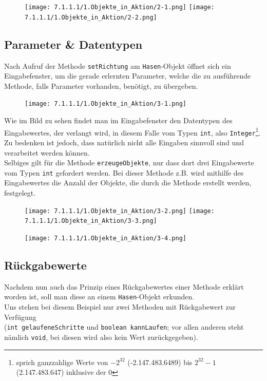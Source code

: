 \documentclass{scrartcl}   %
\begin{document}
\begin{figure}[ht]
	\centering
	\texttt{[image: 7.1.1.1/1.Objekte\_in\_Aktion/2-1.png]}
	\hspace{0.5cm}
	\texttt{[image: 7.1.1.1/1.Objekte\_in\_Aktion/2-2.png]}
\end{figure}

\subsection{Parameter \& Datentypen}
Nach Aufruf der Methode \texttt{setRichtung} am \texttt{Hasen}-Objekt öffnet sich ein Eingabefenster, um die gerade erlernten Parameter, welche die zu ausführende Methode, falls Parameter vorhanden, benötigt, zu übergeben.

\begin{figure}[ht]
	\centering
	\texttt{[image: 7.1.1.1/1.Objekte\_in\_Aktion/3-1.png]}
\end{figure}

Wie im Bild zu sehen findet man im Eingabefenster den Datentypen des Eingabewertes, der verlangt wird, in diesem Falle vom Typen \texttt{int}, also \texttt{Integer}\footnote{sprich ganzzahlige Werte von $-2^{32}$ (-2.147.483.6489) bis $2^{32} -1$ (2.147.483.647) inklusive der 0}. Zu bedenken ist jedoch, dass natürlich nicht alle Eingaben sinnvoll sind und verarbeitet werden können.\\
Selbiges gilt für die Methode \texttt{erzeugeObjekte}, nur dass dort drei Eingabewerte vom Typen \texttt{int} gefordert werden. Bei dieser Methode z.B. wird mithilfe des Eingabewertes die Anzahl der Objekte, die durch die Methode erstellt werden, festgelegt.

\begin{figure}[ht]
	\centering
	\texttt{[image: 7.1.1.1/1.Objekte\_in\_Aktion/3-2.png]}
	\hspace{0.5cm}
	\texttt{[image: 7.1.1.1/1.Objekte\_in\_Aktion/3-3.png]}
\end{figure}

\vspace{0.5cm}

\begin{figure}[ht]
	\centering
	\texttt{[image: 7.1.1.1/1.Objekte\_in\_Aktion/3-4.png]}
\end{figure}

\subsection{Rückgabewerte}
Nachdem nun auch das Prinzip eines Rückgabewertes einer Methode erklärt worden ist, soll man diese an einem \texttt{Hasen}-Objekt erkunden.\\
Uns stehen bei diesem Beispiel nur zwei Methoden mit Rückgabewert zur Verfügung\\
(\texttt{int gelaufeneSchritte} und \texttt{boolean kannLaufen}; vor allen anderen steht nämlich \texttt{void}, bei diesen wird also kein Wert zurückgegeben).
\end{document}

